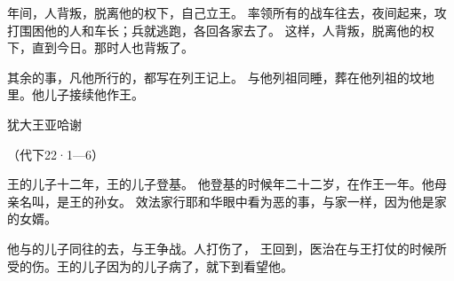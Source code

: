 {\par }{\PP {}年间，{}人背叛{}，脱离他的权下，自己立王。
率领所有的战车往{}去，夜间起来，攻打围困他的{}人和车{}长；{}兵就逃跑，各回各家去了。
这样，{}人背叛{}，脱离他的权下，直到今日。那时{}人也背叛了。
\par }{\PP {}其余的事，凡他所行的，都写在{}列王记上。
与他列祖同睡，葬在{}他列祖的坟地里。他儿子{}接续他作王。
\par }{\SH 犹大王亚哈谢
\par }{\R （代下22·1—6）
\par }{\PP {}王{}的儿子{}十二年，{}王{}的儿子{}登基。
他登基的时候年二十二岁，在{}作王一年。他母亲名叫{}，是{}王{}的孙女。
效法{}家行耶和华眼中看为恶的事，与{}家一样，因为他是{}家的女婿。
\par }{\PP {}他与{}的儿子{}同往{}的{}去，与{}王{}争战。{}人打伤了{}，
王回到{}，医治在{}与{}王{}打仗的时候所受的伤。{}王{}的儿子{}因为{}的儿子{}病了，就下到{}看望他。

}
